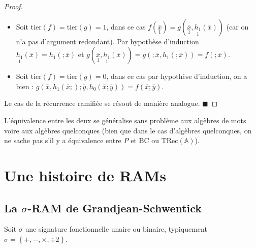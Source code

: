 \documentclass{report}
\newcommand{\TRec}[1]{\text{TRec}\left(\mathbb{#1}\right)}
\begin{document}
\begin{proof}
			\begin{itemize}[itemsep=-1mm]
				\item 	Soit $\text{tier}(f) = \text{tier}(g) = 1$, dans ce cas $f(\underset{1}{\bar{x}}) = g( \underset{1}{\bar{x}}, \underset{1}{h_1}(\bar{x}))$ (car on n'a pas d'argument redondant). Par hypothèse d'induction $\underset{1}{h_1}(\bar{x}) = h_1(;\bar{x})$ et $g(\underset{1}{\bar{x}}, \underset{1}{h_1}(\bar{x})) = g(; \bar{x}, h_1(;\bar{x})) = f(; \bar{x})$.
				
				\item 	Soit $\text{tier}(f) = \text{tier}(g) = 0$, dans ce cas par hypothèse d'induction, on a bien : $g( \bar{x}, h_1(\bar{x};) ; \bar{y}, h_0(\bar{x}; \bar{y})) = f(\bar{x} ; \bar{y})$.
			\end{itemize}
			
			Le cas de la récurrence ramifiée se résout de manière analogue. $\blacksquare$
		\end{proof}
		

		L'équivalence entre les deux se généralise sans problème aux algèbres de mots voire aux algèbres quelconques (bien que dans le cas d'algèbres quelconques, on ne sache pas s'il y a équivalence entre $P$ et $\text{BC}$ ou $\TRec{A}$).
		
		



	\pagebreak
	
	\section{Une histoire de RAMs}
	\label{sec:RAM_story}

	
		\subsection{La $\sigma$-RAM de Grandjean-Schwentick}
		\label{subsec:sigma_RAM}
		
		
		Soit $\sigma$ une signature fonctionnelle unaire ou binaire, typiquement $\sigma = \left\lbrace +, -, \times, \div 2\right\rbrace$. 
		
\end{document}
